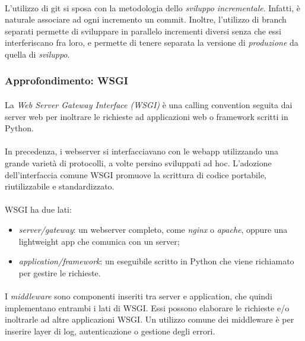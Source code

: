 \documentclass[11pt,a4paper,english]{article}
\begin{document}
\paragraph{} L'utilizzo di git si sposa con la metodologia dello \emph{sviluppo incrementale}. Infatti, è naturale associare ad ogni incremento un commit. Inoltre, l'utilizzo di branch separati permette di sviluppare in parallelo incrementi diversi senza che essi interferiscano fra loro, e permette di tenere separata la versione di \emph{produzione} da quella di \emph{sviluppo}.

\subsubsection{Approfondimento: WSGI}

\paragraph{} La \emph{Web Server Gateway Interface (WSGI)} \cite{wsgi} è una calling convention seguita dai server web per inoltrare le richieste ad applicazioni web o framework scritti in Python. 

\paragraph{} In precedenza, i webserver si interfacciavano con le webapp utilizzando una grande varietà di protocolli, a volte persino sviluppati ad hoc. L'adozione dell'interfaccia comune WSGI promuove la scrittura di codice portabile, riutilizzabile e standardizzato.

\paragraph{} WSGI ha due lati:
\begin{itemize}
    \item \emph{server/gateway}: un webserver completo, come \emph{nginx} o \emph{apache}, oppure una lightweight app che comunica con un server;
    \item \emph{application/framework}: un eseguibile scritto in Python che viene richiamato per gestire le richieste.
\end{itemize}

\paragraph{} I \emph{middleware} sono componenti inseriti tra server e application, che quindi implementano entrambi i lati di WSGI. Essi possono elaborare le richieste e/o inoltrarle ad altre applicazioni WSGI. Un utilizzo comune dei middleware è per inserire layer di log, autenticazione o gestione degli errori. 
\end{document}
